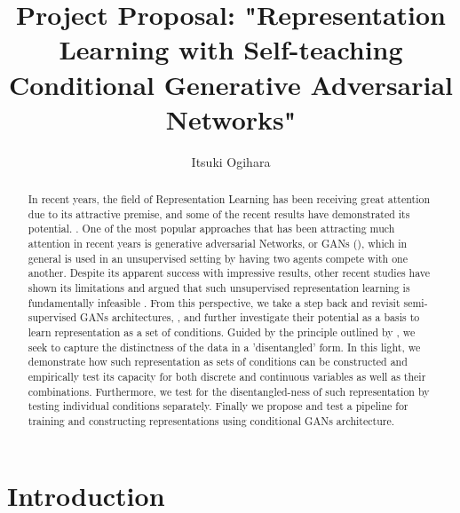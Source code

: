 \documentclass[11pt, letterpaper, oneside]{article}
\title{Project Proposal: "Representation Learning with Self-teaching Conditional Generative Adversarial Networks"}
\author{Itsuki Ogihara} %
\date{}
\begin{document}
\maketitle

\begin{abstract}
In recent years, the field of Representation Learning has been receiving great attention due to its attractive premise, and some of the recent results have demonstrated its potential. \cite{chen_isolating_nodate}\cite{higgins_-vae_2017}. One of the most popular approaches that has been attracting much attention in recent years is generative adversarial Networks, or GANs (\cite{goodfellow_generative_2014}), which in general is used in an unsupervised setting by having two agents compete with one another. Despite its apparent success with impressive results, other recent studies have shown its limitations and argued that such unsupervised representation learning is fundamentally infeasible \cite{locatello_challenging_2019}. From this perspective, we take a step back and revisit semi-supervised GANs architectures\cite{mirza_conditional_nodate}, \cite{chen_self-supervised_2019}, and further investigate their potential as a basis to learn representation as a set of conditions. Guided by the principle outlined by \cite{bengio_representation_2014}, we seek to capture the distinctness of the data in a 'disentangled' form. In this light, we demonstrate how such representation as sets of conditions can be constructed and empirically test its capacity for both discrete and continuous variables as well as their combinations. Furthermore, we test for the disentangled-ness of such representation by testing individual conditions separately. Finally we propose and test a pipeline for training and constructing representations using conditional GANs architecture.
\end{abstract}

\section{Introduction}
\end{document}
